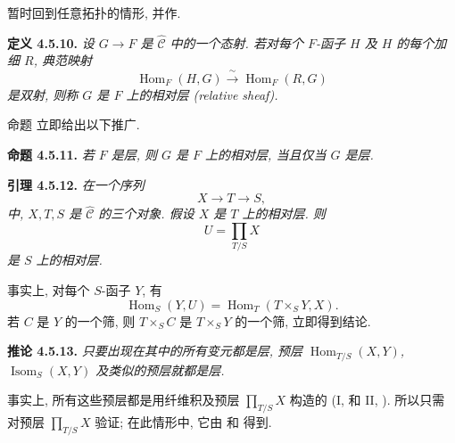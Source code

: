 
暂时回到任意拓扑的情形, 并作.

\medskip
\noindent{}\textbf{定义 4.5.10.}
\textit{设 \(G\to F\) 是 \(\widehat{\mathscr C}\) 中的一个态射.
若对每个 \(F\)-函子 \(H\) 及 \(H\) 的每个加细 \(R\),
典范映射}
\[
\tag{+}\label{sga3:iv:definition:4:5:10:eq:unnamed:01}
  \operatorname{Hom}_{F}(H,G)
  \xrightarrow{\ \sim\ }
  \operatorname{Hom}_{F}(R,G)
\]
\textit{是双射, 则称 \(G\) 是 \emph{\(F\) 上的相对层 (relative sheaf)}.}

命题  立即给出以下推广.

\medskip
\noindent{}\textbf{命题 4.5.11.}
\textit{若 \(F\) 是层, 则 \(G\) 是 \(F\) 上的相对层,
当且仅当 \(G\) 是层.}

\medskip
\noindent{}\textbf{引理 4.5.12.}
\textit{在一个序列}
\[
  X\longrightarrow T\longrightarrow S,
\]
\textit{中, \(X,T,S\) 是 \(\widehat{\mathscr C}\) 的三个对象.
假设 \(X\) 是 \(T\) 上的相对层. 则}
\[
  U=\prod_{T/S}X
\]
\textit{是 \(S\) 上的相对层.}

事实上, 对每个 \(S\)-函子 \(Y\), 有
\[
  \operatorname{Hom}_{S}(Y,U)
  =\operatorname{Hom}_{T}(T\times_SY,X).
\]
若 \(C\) 是 \(Y\) 的一个筛,
则 \(T\times_SC\) 是 \(T\times_SY\) 的一个筛, 立即得到结论.

\medskip
\noindent{}\textbf{推论 4.5.13.}
\textit{只要出现在其中的所有变元都是层,
预层 \(\operatorname{Hom}_{T/S}(X,Y)\),
\(\operatorname{Isom}_{S}(X,Y)\) 及类似的预层就都是层.}

事实上, 所有这些预层都是用纤维积及预层 \(\prod_{T/S}X\)
构造的 (I,  和 II,
).
所以只需对预层 \(\prod_{T/S}X\)
验证;
在此情形中, 它由  和
 得到.


